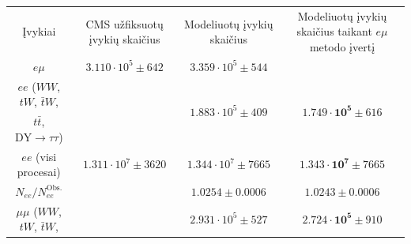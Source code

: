 \documentclass[a4paper, 12pt]{article}
\newcommand{\WW}{W\! W}
\newcommand{\mumu}{\mu\mu}
\newcommand{\DYtau}{\mathrm{DY} \! \rightarrow \! \tau\tau}
\begin{document}
\begin{centering}
\begin{table}
\begin{tabular}{|c|c|c|c|} %
	\hline
	
	\multirow{3}{8em}{\centering Įvykiai} &
	\multirow{3}{7em}{\centering CMS užfiksuotų įvykių skaičius} &
	\multirow{3}{9em}{\centering Modeliuotų įvykių skaičius} &
	\multirow{3}{10em}{\centering Modeliuotų įvykių skaičius taikant $e\mu$ metodo įvertį} \\
	
 	& & & \\
 	& & & \\
	\hline \hline
	
	\multirow{2}{8em}{\centering $e\mu$} &
	\multirow{2}{7em}{\centering $3.110 \cdot 10^5 \pm 642$} &
	\multirow{2}{9em}{\centering $3.359 \cdot 10^5 \pm 544$ } &
	\multirow{2}{5em}{\centering \textendash }\\
	
 	& & & \\
	\hline
	
	$ee$ ($\WW$, $tW$, $\bar{t}W$, &
	\multirow{2}{7em}{\centering\textendash} &
	\multirow{2}{9em}{\centering $1.883 \cdot 10^5 \pm 409$} &
	\multirow{2}{9em}{\centering$\mathbf{1.749 \cdot 10^5} \pm 616$} \\
	
	$t\bar{t}$, $\DYtau$) & & & \\
	\hline
	
	\multirow{2}{8em}{\centering $ee$ (visi procesai)} &
	\multirow{2}{7em}{\centering $1.311 \cdot 10^7 \pm 3620$} &
	\multirow{2}{10em}{\centering $1.344 \cdot 10^7 \pm 7665$}
	&\multirow{2}{10em}{\centering $\mathbf{1.343 \cdot 10^7} \pm 7665$} \\
	
 	& & & \\
	\hline

	\multirow{2}{8em}{\centering $N_{ee}/N_{ee}^{\mathrm{Obs.}}$} &
	\multirow{2}{7em}{\centering 1} &
	\multirow{2}{10em}{\centering $1.0254 \pm 0.0006$} &
	\multirow{2}{10em}{\centering $1.0243 \pm 0.0006$} \\
	
 	& & & \\
	\hline

	$\mumu$ ($\WW$, $tW$, $\bar{t}W$, &
	\multirow{2}{7em}{\centering\textendash} &
	\multirow{2}{9em}{\centering $2.931 \cdot 10^5 \pm 527$} &
	\multirow{2}{9em}{\centering$\mathbf{2.724 \cdot 10^5} \pm 910$} \\
	

\end{tabular}
\end{table}
\end{centering}
\end{document}

